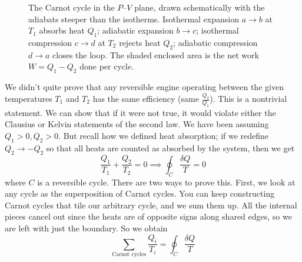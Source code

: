 \documentclass{report}
\numberwithin{equation}{section}
\begin{document}
\begin{figure}[H]
\caption{The Carnot cycle in the $P$--$V$ plane, drawn schematically with the
adiabats steeper than the isotherms. Isothermal expansion $a\!\to\!b$ at $T_1$
absorbs heat $Q_1$; adiabatic expansion $b\!\to\!c$; isothermal compression
$c\!\to\!d$ at $T_2$ rejects heat $Q_2$; adiabatic compression $d\!\to\!a$
closes the loop. The shaded enclosed area is the net work $W = Q_1 - Q_2$
done per cycle.}
\label{fig:carnot_cycle}
\end{figure}

We didn't quite prove that any reversible engine operating between the given temperatures $T_1$ and $T_2$ has the same efficiency (same $\frac{Q_2}{Q_1}$). This is a nontrivial statement. We can show that if it were not true, it would violate either the Clausius or Kelvin statements of the second law.
We have been assuming $Q_1>0, Q_2>0$. But recall how we defined heat absorption; if we redefine $Q_2\rightarrow -Q_2$ so that all heats are counted as absorbed by the system, then we get
\begin{equation}
    \frac{Q_1}{T_1} + \frac{Q_2}{T_2} = 0 \implies \oint_C \frac{\delta Q}{T} =0
\end{equation}
where $C$ is a reversible cycle. There are two ways to prove this. First, we look at any cycle as the superposition of Carnot cycles. You can keep constructing Carnot cycles that tile our arbitrary cycle, and we sum them up. All the internal pieces cancel out since the heats are of opposite signs along shared edges, so we are left with just the boundary. So we obtain
\begin{equation}
    \sum_{\text{Carnot cycles}}\frac{Q_i}{T_i} =\oint_C\frac{\delta Q}{T}
\end{equation}
\end{document}
